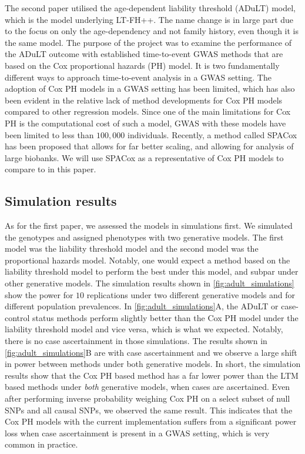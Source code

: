 The second paper utilised the age-dependent liability threshold (ADuLT) model, which is the model underlying LT-FH++. The name change is in large part due to the focus on only the age-dependency and not family history, even though it is the same model. The purpose of the project was to examine the performance of the ADuLT outcome with established time-to-event GWAS methods that are based on the Cox proportional hazards (PH) model. It is two fundamentally different ways to approach time-to-event analysis in a GWAS setting. The adoption of Cox PH models in a GWAS setting has been limited, which has also been evident in the relative lack of method developments for Cox PH models compared to other regression models. Since one of the main limitations for Cox PH is the computational cost of such a model, GWAS with these models have been limited to less than $ 100,000 $ individuals. Recently, a method called SPACox \cite{bi2020fast} has been proposed that allows for far better scaling, and allowing for analysis of large biobanks. We will use SPACox as a representative of Cox PH models to compare to in this paper.

\subsection{Simulation results}

As for the first paper, we assessed the models in simulations first. We simulated the genotypes and assigned phenotypes with two generative models. The first model was the liability threshold model and the second model was the proportional hazards model. Notably, one would expect a method based on the liability threshold model to perform the best under this model, and subpar under other generative models. The simulation results shown in \cref{fig:adult_simulations} show the power for $ 10 $ replications under two different generative models and for different population prevalences. In \cref{fig:adult_simulations}A, the ADuLT or case-control status methods perform slightly better than the Cox PH model under the liability threshold model and vice versa, which is what we expected. Notably, there is no case ascertainment in those simulations. The results shown in \cref{fig:adult_simulations}B are with case ascertainment and we observe a large shift in power between methods under both generative models. In short, the simulation results show that the Cox PH based method has a far lower power than the LTM based methods under \textit{both} generative models, when cases are ascertained. Even after performing inverse probability weighing Cox PH on a select subset of null SNPs and all causal SNPs, we observed the same result. This indicates that the Cox PH models with the current implementation suffers from a significant power loss when case ascertainment is present in a GWAS setting, which is very common in practice.

